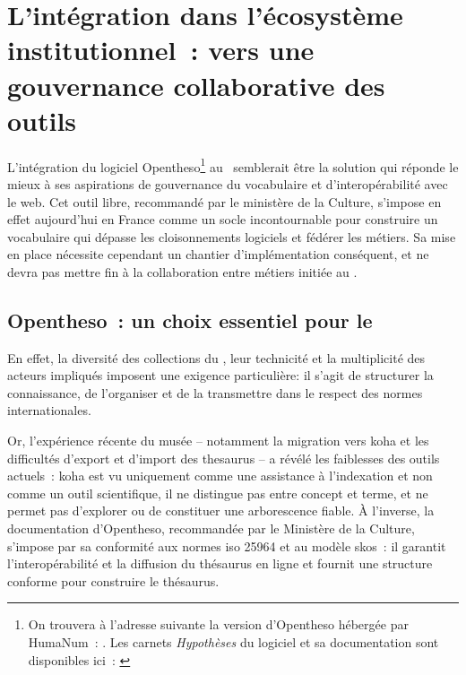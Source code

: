 \section{\label{III-A-3}L’intégration dans l’écosystème institutionnel~: vers une gouvernance collaborative des outils}



L’intégration du logiciel Opentheso\footnote{On trouvera à l'adresse suivante la version d'Opentheso hébergée par HumaNum~: \cite{OpenThesoa}. Les carnets \textit{Hypothèses} du logiciel et sa documentation sont disponibles ici~: \cite{PresentationDOpenTheso}} au \mae~semblerait être la solution qui réponde le mieux à ses aspirations de gouvernance du vocabulaire et d'interopérabilité avec le web. Cet outil libre, recommandé par le ministère de la Culture, s’impose en effet aujourd'hui en France comme un socle incontournable pour construire un vocabulaire qui dépasse les cloisonnements logiciels et fédérer les métiers. Sa mise en place nécessite cependant un chantier d'implémentation conséquent, et ne devra pas mettre fin à la collaboration entre métiers initiée au \mae.



\subsection{Opentheso~: un choix essentiel pour le \mae}





En effet, la diversité des collections du \mae, leur technicité et la multiplicité des acteurs impliqués imposent une exigence particulière: il s'agit de structurer la connaissance, de l’organiser et de la transmettre dans le respect des normes internationales.  



Or, l’expérience récente du musée – notamment la migration vers \gls{koha} et les difficultés d’export et d’import des \gls{thesaurus} – a révélé les faiblesses des outils actuels~: \gls{koha} est vu uniquement comme une assistance à l'indexation et non comme un outil scientifique, il ne distingue pas entre concept et terme, et ne permet pas d’explorer ou de constituer une arborescence fiable. À l’inverse, la documentation d’Opentheso, recommandée par le Ministère de la Culture, s’impose par sa conformité aux normes \gls{iso} 25964 et au modèle \gls{skos}~: il garantit l'interopérabilité et la diffusion du thésaurus en ligne et fournit une structure conforme pour construire le thésaurus.



